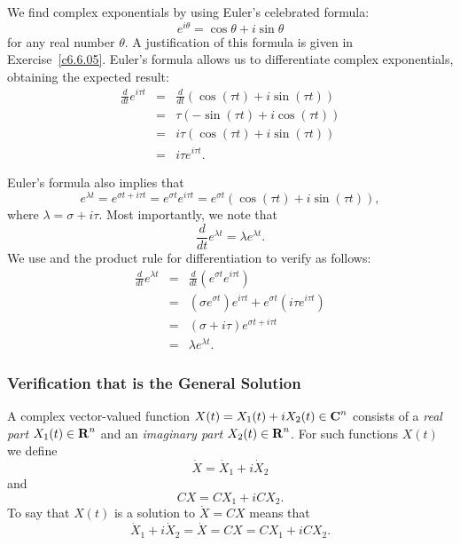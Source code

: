 We find complex exponentials by using Euler's celebrated formula:
\begin{equation}  \label{E:Euler}
e^{i\theta} = \cos\theta + i\sin\theta
\end{equation}
for any real number $\theta$.  A justification of this formula is
given in Exercise~\ref{c6.6.05}.   Euler's formula allows us to differentiate
complex exponentials, obtaining the expected result:
\begin{eqnarray*}
\frac{d}{dt}e^{i\tau t} & = &
\frac{d}{dt}(\cos(\tau t) + i\sin(\tau t))\\
& = & \tau(-\sin(\tau t) + i\cos(\tau t)) \\
& = & i\tau(\cos(\tau t) + i\sin(\tau t))\\
& = & i\tau e^{i\tau t}.
\end{eqnarray*}

Euler's formula also implies that
\begin{equation}  \label{E:ecis}
e^{\lambda t} = e^{\sigma t + i\tau t} = e^{\sigma t}e^{i\tau t} =
e^{\sigma t}(\cos(\tau t) + i\sin(\tau t)),
\end{equation}
where $\lambda = \sigma+i\tau$.  Most importantly, we note that
\begin{equation}  \label{E:eldiff}
\frac{d}{dt}e^{\lambda t} = \lambda e^{\lambda t}.
\end{equation}
We use  and the product rule for differentiation to verify
 as follows:
\begin{eqnarray*}
\frac{d}{dt}e^{\lambda t} & =  &
\frac{d}{dt}\left(e^{\sigma t}e^{i\tau t}\right)\\
& = & \left(\sigma e^{\sigma t}\right)e^{i\tau t}
+ e^{\sigma t}\left(i\tau e^{i\tau t}\right)\\
& = & (\sigma+i\tau)e^{\sigma t + i\tau t} \\
& = & \lambda e^{\lambda t}.
\end{eqnarray*}

\subsubsection*{Verification that \protect{} is the General Solution}

A complex vector-valued function $X(t)=X_1(t)+iX_2(t)\in\mbox{$\bf{C}$}^n$
 consists of
a {\em real part\/} $X_1(t)\in\mbox{$\bf{R}$}^n$ and an {\em imaginary part\/}
$X_2(t)\in\mbox{$\bf{R}$}^n$.  For such functions $X(t)$ we define
\[
\dot{X} = \dot{X}_1+i\dot{X}_2
\]
and
\[
CX = CX_1 + iCX_2.
\]
To say that $X(t)$ is a solution to $\dot{X}=CX$ means that
\begin{equation}  \label{E:X1X2}
\dot{X}_1+i\dot{X}_2 = \dot{X} = CX = CX_1 + iCX_2.
\end{equation}

